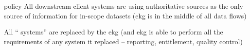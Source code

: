 \kgmmscoringlevelFour

\begin{scoring}

    \item [policy] All downstream client systems are using authoritative sources as the only source of information
          for in-scope datasets (\gls{ekg} is in the middle of all data flows)
    \item All “ systems” are replaced by the \gls{ekg}
          (and \gls{ekg} is able to perform all the requirements of any system it replaced --
          reporting, entitlement, quality control)

\end{scoring}
